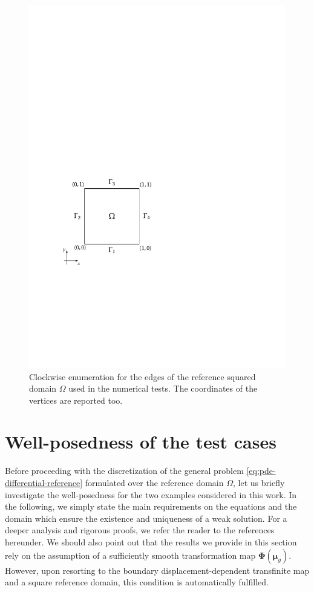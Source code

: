 \documentclass[12pt, a4paper, twoside, openright]{report}
\numberwithin{equation}{chapter}
\theoremstyle{theorem}
\theoremstyle{definition}
\theoremstyle{remark}
\theoremstyle{proposition}
\numberwithin{figure}{chapter}
\newcommand{\bg}[1]{\boldsymbol{#1}}
\begin{document}
		\begin{figure}[t]
			\center
			\includegraphics[scale = 0.725]{bc_square}
			
			\caption{Clockwise enumeration for the edges of the reference squared domain $\Omega$ used in the numerical tests. The coordinates of the vertices are reported too.}
			\label{fig:bc-square}
		\end{figure}
		
	\vspace*{0.3cm}
	
	\section{Well-posedness of the test cases}
	\label{section:Well-posedness of the test cases}
	
		Before proceeding with the discretization of the general problem \eqref{eq:pde-differential-reference} formulated over the reference domain $\Omega$, let us briefly investigate the well-posedness for the two examples considered in this work. In the following, we simply state the main requirements on the equations and the domain which ensure the existence and uniqueness of a weak solution. For a deeper analysis and rigorous proofs, we refer the reader to the references hereunder. We should also point out that the results we provide in this section rely on the assumption of a sufficiently smooth transformation map $\bg{\Phi}(\bg{\mu}_g)$. However, upon resorting to the boundary displacement-dependent transfinite map and a square reference domain, this condition is automatically fulfilled. 
		
\end{document}

